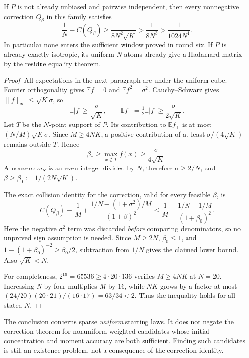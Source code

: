 \begin{theorem}
\label{thm:minimal-buffer-obstruction}
If $P$ is not already unbiased and pairwise independent, then every
nonnegative correction $Q_\beta$ in this family satisfies
\[
 \frac1N-C(Q_\beta)\ge\frac1{8N^2\sqrt K}>
 \frac1{8N^3}>\frac1{1024N^4}.
\]
In particular none enters the sufficient window proved in round six.
If $P$ is already exactly isotropic, its uniform $N$ atoms already
give a Hadamard matrix by the residue equality theorem.
\end{theorem}
\begin{proof}
All expectations in the next paragraph are under the uniform cube.
Fourier orthogonality gives $\mathbb E f=0$ and
$\mathbb E f^2=\sigma^2$. Cauchy--Schwarz gives
$\|f\|_\infty\le\sqrt K\sigma$, so
\[
 \mathbb E|f|\ge\frac{\sigma}{\sqrt K},\qquad
 \mathbb E f_+=\tfrac12\mathbb E|f|
       \ge\frac{\sigma}{2\sqrt K}.
\]
Let $T$ be the $N$-point support of $P$. Its contribution to
$\mathbb E f_+$ is at most $(N/M)\sqrt K\sigma$.
Since $M\ge4NK$, a positive contribution of at least
$\sigma/(4\sqrt K)$ remains outside $T$. Hence
\[
 \beta_*\ge\max_{x\notin T}f(x)
          \ge\frac{\sigma}{4\sqrt K}.
\]
A nonzero $m_S$ is an even integer divided by $N$; therefore
$\sigma\ge2/N$, and
$\beta\ge\beta_0:=1/(2N\sqrt K)$.

The exact collision identity for the correction, valid for every
feasible $\beta$, is
\[
 C(Q_\beta)=\frac1M+
 \frac{1/N-(1+\sigma^2)/M}{(1+\beta)^2}
 \le\frac1M+\frac{1/N-1/M}{(1+\beta_0)^2}.
\]
Here the negative $\sigma^2$ term was discarded \emph{before}
comparing denominators, so no unproved sign assumption is needed.
Since $M\ge2N$, $\beta_0\le1$, and
$1-(1+\beta_0)^{-2}\ge\beta_0/2$, subtraction from $1/N$ gives
the claimed lower bound. Also $\sqrt K<N$.

For completeness, $2^{16}=65536\ge4\cdot20\cdot136$ verifies
$M\ge4NK$ at $N=20$. Increasing $N$ by four multiplies $M$ by
$16$, while $NK$ grows by a factor at most
$(24/20)(20\cdot21)/(16\cdot17)=63/34<2$.
Thus the inequality holds for all stated $N$.
\end{proof}

The conclusion concerns sparse \emph{uniform} starting laws. It does
not negate the correction theorem for nonuniform weighted candidates
whose initial concentration and moment accuracy are both sufficient.
Finding such candidates is still an existence problem, not a
consequence of the correction identity.
